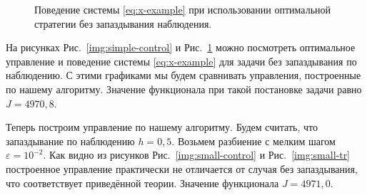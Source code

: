 \begin{figure}[bh]
        \noindent{}
        \caption{Поведение системы \eqref{eq:x-example} при использовании оптимальной стратегии без запаздывания наблюдения.}
        \label{img:simple-tr}
\end{figure}

На рисунках Рис.~\ref{img:simple-control} и Рис.~\ref{img:simple-tr} можно посмотреть оптимальное управление и поведение системы \eqref{eq:x-example} для задачи без запаздывания по наблюдению. С этими графиками мы будем сравнивать управления, построенные по нашему алгоритму. Значение функционала при такой постановке задачи равно $J = 4970,\!8$.

Теперь построим управление по нашему алгоритму. Будем считать, что запаздывание по наблюдению $h = 0,\!5$. Возьмем разбиение с мелким шагом $\varepsilon = 10^{-2}$. Как видно из рисунков Рис.~\ref{img:small-control} и Рис.~\ref{img:small-tr} построенное управление практически не отличается от случая без запаздывания, что соответствует приведённой теории. Значение функционала $J = 4971,\!0$.

